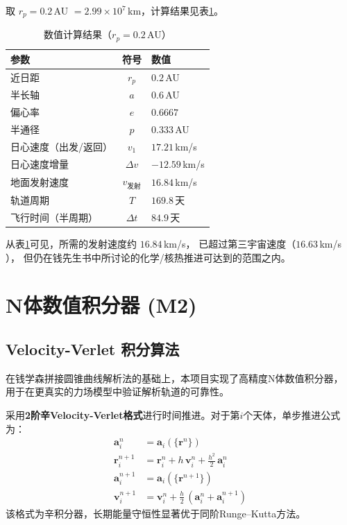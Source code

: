 \documentclass[UTF8,12pt,a4paper]{ctexart}
\begin{document}
取 $r_p = 0.2$\,AU $= 2.99 \times 10^7$\,km，计算结果见表\ref{tab:results}。

\begin{table}[htbp]
\centering
\caption{数值计算结果（$r_p = 0.2$\,AU）}
\label{tab:results}
\begin{tabular}{lcl}
    \toprule
    参数 & 符号 & 数值 \\
    \midrule
    近日距             & $r_p$   & $0.2$\,AU \\
    半长轴             & $a$     & $0.6$\,AU \\
    偏心率             & $e$     & $0.6667$ \\
    半通径             & $p$     & $0.333$\,AU \\
    日心速度（出发/返回） & $v_1$ & $17.21$\,km/s \\
    日心速度增量       & $\Delta v$ & $-12.59$\,km/s \\
    地面发射速度       & $v_{\text{发射}}$ & $16.84$\,km/s \\
    轨道周期           & $T$     & $169.8$\,天 \\
    飞行时间（半周期） & $\Delta t$ & $84.9$\,天 \\
    \bottomrule
\end{tabular}
\end{table}

从表\ref{tab:results}可见，所需的发射速度约 $16.84$\,km/s，
已超过第三宇宙速度（$16.63$\,km/s \cite[\S1.5, pp.~18]{qian2008}），
但仍在钱先生书中所讨论的化学/核热推进可达到的范围之内\cite[第7章]{qian2008}。

\section{N体数值积分器 (M2)}

\subsection{Velocity-Verlet 积分算法}

在钱学森拼接圆锥曲线解析法的基础上，本项目实现了高精度N体数值积分器，
用于在更真实的力场模型中验证解析轨道的可靠性。

采用\textbf{2阶辛Velocity-Verlet格式}进行时间推进。对于第$i$个天体，单步推进公式为：
\begin{align}
    \mathbf{a}_i^n &= \mathbf{a}_i(\{\mathbf{r}^n\}) \label{eq:vv_a} \\
    \mathbf{r}_i^{n+1} &= \mathbf{r}_i^n + h\,\mathbf{v}_i^n
                         + \frac{h^2}{2}\,\mathbf{a}_i^n \label{eq:vv_r} \\
    \mathbf{a}_i^{n+1} &= \mathbf{a}_i(\{\mathbf{r}^{n+1}\}) \label{eq:vv_a2} \\
    \mathbf{v}_i^{n+1} &= \mathbf{v}_i^n + \frac{h}{2}\,
                          (\mathbf{a}_i^n + \mathbf{a}_i^{n+1}) \label{eq:vv_v}
\end{align}
该格式为辛积分器，长期能量守恒性显著优于同阶Runge--Kutta方法。
\end{document}

